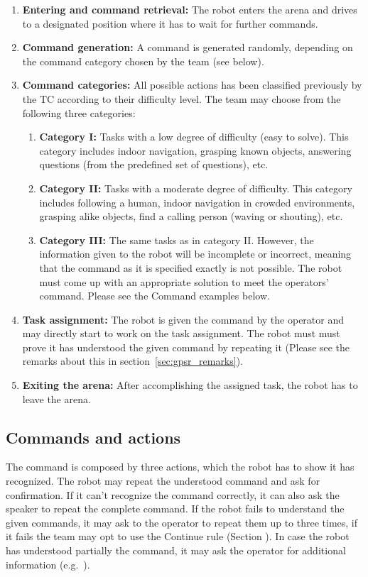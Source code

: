 \begin{enumerate}
	\item \textbf{Entering and command retrieval:} The robot enters the arena and drives to a designated position where it has to wait for further commands.
	\item \textbf{Command generation:} A command is generated randomly, depending on the command category chosen by the team (see below). \\

	\item \textbf{Command categories:} All possible actions has been classified previously by the TC according to their difficulty level. The team may choose from the following three categories:
	\begin{enumerate}
		\item \textbf{Category I:} Tasks with a low degree of difficulty (easy to solve). This category includes indoor navigation, grasping known objects, answering questions (from the predefined set of questions), etc.
		\item \textbf{Category II:} Tasks with a moderate degree of difficulty. This category includes following a human, indoor navigation in crowded environments, grasping alike objects, find a calling person (waving or shouting), etc.
		\item \textbf{Category III:} The same tasks as in category II. However, the information given to the robot will be incomplete or incorrect, meaning that the command as it is specified exactly is not possible. The robot must come up with an appropriate solution to meet the operators' command. Please see the Command examples below.
	\end{enumerate}

	\item \textbf{Task assignment:} The robot is given the command by the operator and may directly start to work on the task assignment. The robot must must prove it has understood the given command by repeating it (Please see the remarks about this in section~\ref{sec:gpsr_remarks}).
	\item \textbf{Exiting the arena:} After accomplishing the assigned task, the robot has to leave the arena.
\end{enumerate}

\subsection{Commands and actions}
The command is composed by three actions, which the robot has to show it has recognized. The robot may repeat the understood command and ask for confirmation. If it can't recognize the command correctly, it can also ask the speaker to repeat the complete command. If the robot fails to understand the given commands, it may ask to the operator to repeat them up to three times, if it fails the team may opt to use the Continue rule (Section ). In case the robot has understood partially the command, it may ask the operator for additional information (e.g.~).

